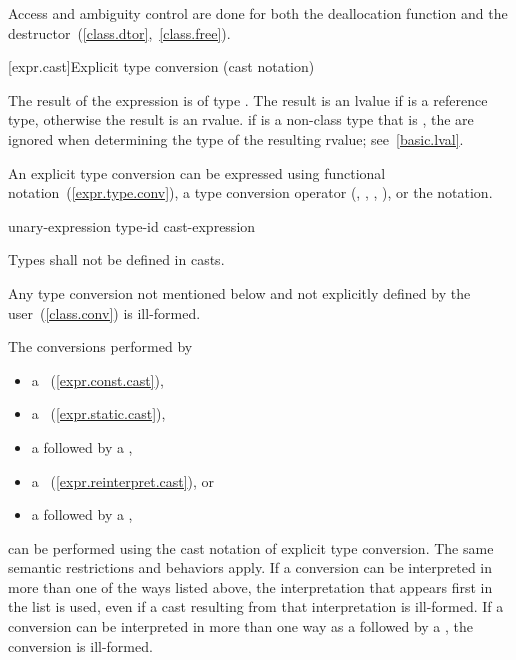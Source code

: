 \pnum
Access and ambiguity control are done for both the deallocation function
and the destructor~(\ref{class.dtor},~\ref{class.free}).

[expr.cast]{Explicit type conversion (cast notation)}%

\pnum
The result of the expression   is
of type . The result is an lvalue if  is a reference
type, otherwise the result is an rvalue.
\enternote 
if  is a non-class type that is , the
 are ignored when determining the type of the
resulting rvalue; see~\ref{basic.lval}.
\exitnote 

\pnum
An explicit type conversion can be expressed using functional
notation~(\ref{expr.type.conv}), a type conversion operator
(, , ,
), or the  notation.

\begin{bnf}
\br
    unary-expression\br
    \terminal{(} type-id \terminal{)} cast-expression
\end{bnf}

\pnum
Types shall not be defined in casts.

\pnum
Any type conversion not mentioned below and not explicitly defined by
the user~(\ref{class.conv}) is ill-formed.

\pnum
The conversions performed by

\begin{itemize}
%
%
%
\item a ~(\ref{expr.const.cast}),
\item a ~(\ref{expr.static.cast}),
\item a  followed by a ,
\item a ~(\ref{expr.reinterpret.cast}), or
\item a  followed by a ,
\end{itemize}

can be performed using the cast notation of explicit type conversion.
The same semantic restrictions and behaviors apply. If a conversion
can be interpreted in more than one of the ways listed above, the
interpretation that appears first in the list is used, even if a cast
resulting from that interpretation is ill-formed. If a conversion can be
interpreted in more than one way as a  followed by a
, the conversion is ill-formed.
\enterexample

